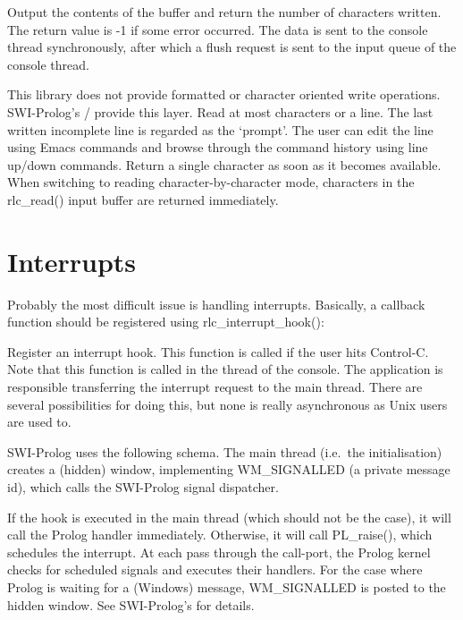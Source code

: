 \documentclass[11pt]{article}
\begin{document}
\begin{description}
Output the contents of the buffer and return the number of characters
written.  The return value is -1 if some error occurred.  The data is
sent to the console thread synchronously, after which a flush request
is sent to the input queue of the console thread.

This library does not provide formatted or character oriented write
operations.  SWI-Prolog's /
provide this layer.
Read at most  characters or a line.  The last written
incomplete line is regarded as the `prompt'.  The user can edit the
line using Emacs commands and browse through the command history using
line up/down commands.
Return a single character as soon as it becomes available. When
switching to reading character-by-character mode, characters in
the rlc_read() input buffer are returned immediately.
\end{description}

\section{Interrupts}

Probably the most difficult issue is handling interrupts.  Basically,
a callback function should be registered using rlc_interrupt_hook():

\begin{description}
Register an interrupt hook.  This function is called if the user hits
Control-C.  Note that this function is called in the thread of the
console.  The application is responsible transferring the interrupt
request to the main thread.  There are several possibilities for
doing this, but none is really asynchronous as Unix users are used
to.

SWI-Prolog uses the following schema.  The main thread (i.e.\ the
initialisation) creates a (hidden) window, implementing WM_SIGNALLED
(a private message id), which calls the SWI-Prolog signal dispatcher.

If the hook is executed in the main thread (which should not be the
case), it will call the Prolog handler immediately.  Otherwise, it
will call PL_raise(), which schedules the interrupt.  At each pass
through the call-port, the Prolog kernel checks for scheduled signals
and executes their handlers. For the case where Prolog is waiting for
a (Windows) message, WM_SIGNALLED is posted to the hidden window.
See SWI-Prolog's  for details.
\end{description}
\end{document}
